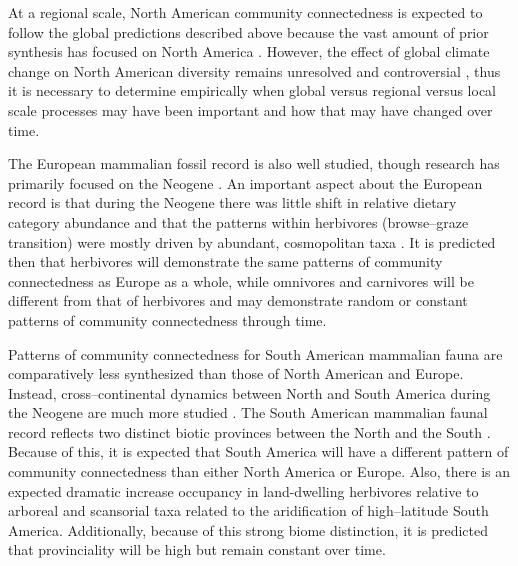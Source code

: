 \documentclass[12pt,letterpaper]{article}
\begin{document}
At a regional scale, North American community connectedness is expected to follow the global predictions described above because the vast amount of prior synthesis has focused on North America \citep{Alroy2000g,Alroy1996a,Alroy1998,Barnosky2001a,Simpson1944,Simpson1953,Badgley2013,Blois2009,Figueirido2012,Gunnell1995,Hadly2001}. However, the effect of global climate change on North American diversity remains unresolved and controversial \citep{Alroy2000g,Blois2009,Figueirido2012,Barnosky2001a}, thus it is necessary to determine empirically when global versus regional versus local scale processes may have been important and how that may have changed over time.

The European mammalian fossil record is also well studied, though research has primarily focused on the Neogene \citep{Jernvall2002,Jernvall2004,Liow2008,Raia2006,Raia2005,Raia2011c}. An important aspect about the European record is that during the Neogene there was little shift in relative dietary category abundance \citep{Jernvall2004} and that the patterns within herbivores (browse--graze transition) were mostly driven by abundant, cosmopolitan taxa \citep{Jernvall2002}. It is predicted then that herbivores will demonstrate the same patterns of community connectedness as Europe as a whole, while omnivores and carnivores will be different from that of herbivores and may demonstrate random or constant patterns of community connectedness through time. 

Patterns of community connectedness for South American mammalian fauna are comparatively less synthesized than those of North American and Europe. Instead, cross--continental dynamics between North and South America during the Neogene are much more studied \citep{Marshall1982}. The South American mammalian faunal record reflects two distinct biotic provinces between the North and the South \citep{Macfadden1997,Macfadden2006,Flynn1998a,Patterson1968}. Because of this, it is expected that South America will have a different pattern of community connectedness than either North America or Europe. Also, there is an expected dramatic increase occupancy in land-dwelling herbivores relative to arboreal and scansorial taxa related to the aridification of high--latitude South America. Additionally, because of this strong biome distinction, it is predicted that provinciality will be high but remain constant over time. %
\end{document}
